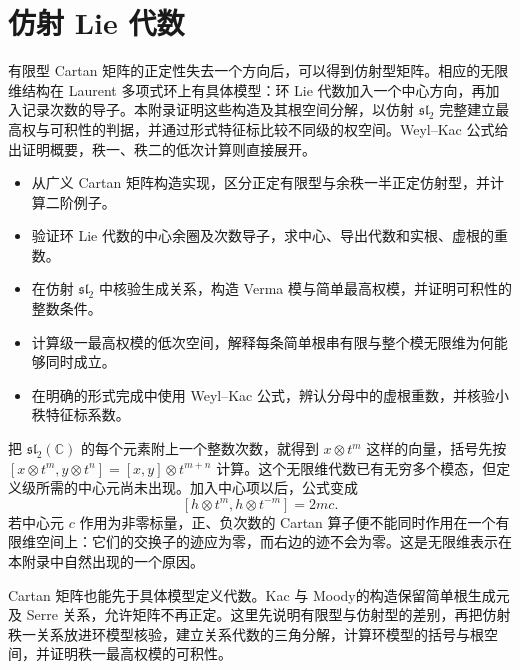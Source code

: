 
\chapter{仿射 Lie 代数}
\label{b5:app:G}

\begin{chapterabstract}
	有限型 Cartan 矩阵的正定性失去一个方向后，可以得到仿射型矩阵。相应的无限维结构在 Laurent 多项式环上有具体模型：环 Lie 代数加入一个中心方向，再加入记录次数的导子。本附录证明这些构造及其根空间分解，以仿射 \(\mathfrak{sl}_2\) 完整建立最高权与可积性的判据，并通过形式特征标比较不同级的权空间。Weyl–Kac 公式给出证明概要，秩一、秩二的低次计算则直接展开。
\end{chapterabstract}

\begin{learninggoals}
	\begin{itemize}
		\item 从广义 Cartan 矩阵构造实现，区分正定有限型与余秩一半正定仿射型，并计算二阶例子。
		\item 验证环 Lie 代数的中心余圈及次数导子，求中心、导出代数和实根、虚根的重数。
		\item 在仿射 \(\mathfrak{sl}_2\) 中核验生成关系，构造 Verma 模与简单最高权模，并证明可积性的整数条件。
		\item 计算级一最高权模的低次空间，解释每条简单根串有限与整个模无限维为何能够同时成立。
		\item 在明确的形式完成中使用 Weyl–Kac 公式，辨认分母中的虚根重数，并核验小秩特征标系数。
	\end{itemize}
\end{learninggoals}

把 \(\mathfrak{sl}_2(\mathbb C)\) 的每个元素附上一个整数次数，就得到 \(x\otimes t^m\) 这样的向量，括号先按 \([x\otimes t^m,y\otimes t^n]=[x,y]\otimes t^{m+n}\) 计算。这个无限维代数已有无穷多个模态，但定义级所需的中心元尚未出现。加入中心项以后，公式变成
\[
	[h\otimes t^m,h\otimes t^{-m}]=2m c.
\]
若中心元 \(c\) 作用为非零标量，正、负次数的 Cartan 算子便不能同时作用在一个有限维空间上：它们的交换子的迹应为零，而右边的迹不会为零。这是无限维表示在本附录中自然出现的一个原因。

\ProseParagraphBreak
Cartan 矩阵也能先于具体模型定义代数。Kac 与 Moody的构造保留简单根生成元及 Serre 关系，允许矩阵不再正定。这里先说明有限型与仿射型的差别，再把仿射秩一关系放进环模型核验，建立关系代数的三角分解，计算环模型的括号与根空间，并证明秩一最高权模的可积性。

